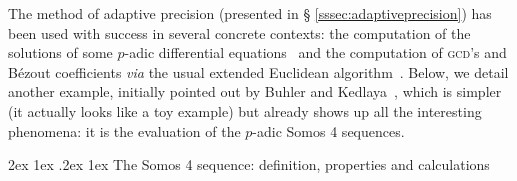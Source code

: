 \documentclass[11pt]{article}
\makeatletter
\numberwithin{equation}{section}
\numberwithin{figure}{section}
\renewcommand\paragraph{\@startsection{paragraph}{4}{\z@}%
                                    {2ex \@plus1ex \@minus.2ex}%
                                    {1ex}%
                                    {\normalfont\normalsize\bfseries}}
\theoremstyle{definition}
\makeatother
\begin{document}
The method of adaptive precision (presented in \S 
\ref{sssec:adaptiveprecision}) has been used with success in several 
concrete contexts: the computation of the solutions of some $p$-adic 
differential equations~\cite{LaVa16} and the computation of 
\textsc{gcd}'s and Bézout coefficients \emph{via} the usual extended 
Euclidean algorithm~\cite{Ca17}.
Below, we detail another example, initially pointed out by Buhler and 
Kedlaya~\cite{BuKe12}, which is simpler (it actually looks like a toy 
example) but already shows up all the interesting phenomena: it is the 
evaluation of the $p$-adic Somos 4 sequences.

\paragraph{The Somos 4 sequence: definition, properties and calculations}
\end{document}
